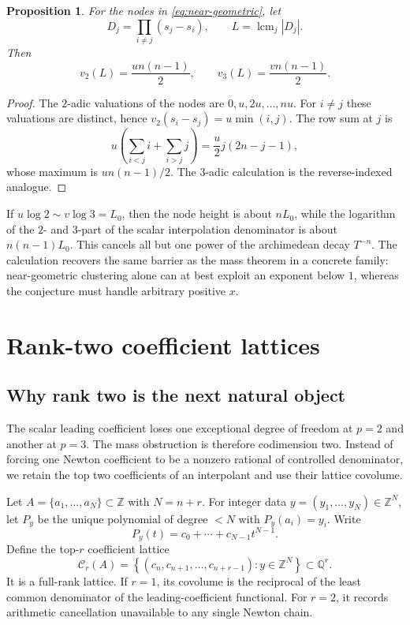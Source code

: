 \documentclass[11pt]{article}
\newtheorem{proposition}[theorem]{Proposition}
\theoremstyle{definition}
\theoremstyle{remark}
\newcommand{\Z}{\mathbb Z}
\newcommand{\Q}{\mathbb Q}
\newcommand{\lcm}{\operatorname{lcm}}
\newcommand{\calC}{\mathcal C}
\newcommand{\abs}[1]{\left|#1\right|}
\begin{document}
\begin{proposition}\label{prop:line-tax}
For the nodes in \eqref{eq:near-geometric}, let
\[
 D_j=\prod_{i\ne j}(s_j-s_i),\qquad
 L=\lcm_j\abs{D_j}.
\]
Then
\[
 v_2(L)=\frac{u n(n-1)}2,
 \qquad
 v_3(L)=\frac{v n(n-1)}2.
\]
\end{proposition}
\begin{proof}
The $2$-adic valuations of the nodes are $0,u,2u,\dots,nu$.  For $i\ne j$ these valuations are distinct, hence
$v_2(s_i-s_j)=u\min(i,j)$.  The row sum at $j$ is
\[
 u\left(\sum_{i<j}i+\sum_{i>j}j\right)
 =\frac u2j(2n-j-1),
\]
whose maximum is $un(n-1)/2$.  The $3$-adic calculation is the reverse-indexed analogue.
\end{proof}

If $u\log2\sim v\log3=L_0$, then the node height is about $nL_0$, while the logarithm of the $2$- and $3$-part of the scalar interpolation denominator is about $n(n-1)L_0$.  This cancels all but one power of the archimedean decay $T^{-n}$.  The calculation recovers the same barrier as the mass theorem in a concrete family: near-geometric clustering alone can at best exploit an exponent below $1$, whereas the conjecture must handle arbitrary positive $x$.

\section{Rank-two coefficient lattices}\label{sec:rank-two}

\subsection{Why rank two is the next natural object}
The scalar leading coefficient loses one exceptional degree of freedom at $p=2$ and another at $p=3$.  The mass obstruction is therefore codimension two.  Instead of forcing one Newton coefficient to be a nonzero rational of controlled denominator, we retain the top two coefficients of an interpolant and use their lattice covolume.

Let $A=\{a_1,\dots,a_N\}\subset\Z$ with $N=n+r$.  For integer data $y=(y_1,\dots,y_N)\in\Z^N$, let $P_y$ be the unique polynomial of degree $<N$ with $P_y(a_i)=y_i$.  Write
\[
       P_y(t)=c_0+\cdots+c_{N-1}t^{N-1}.
\]
Define the top-$r$ coefficient lattice
\begin{equation}\label{eq:coefficient-lattice}
 \calC_r(A)=
 \left\{(c_n,c_{n+1},\dots,c_{n+r-1}):y\in\Z^N\right\}
 \subset\Q^r.
\end{equation}
It is a full-rank lattice.  If $r=1$, its covolume is the reciprocal of the least common denominator of the leading-coefficient functional.  For $r=2$, it records arithmetic cancellation unavailable to any single Newton chain.
\end{document}
